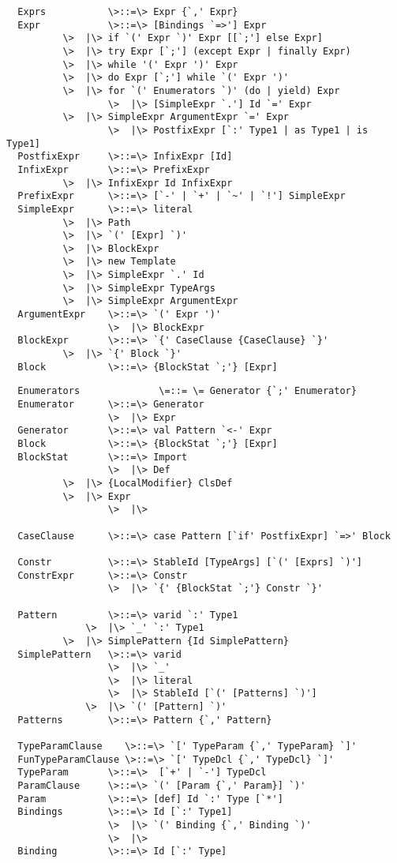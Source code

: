 \documentclass[11pt]{report}
\begin{document}
\begin{itemize}
\begin{verbatim}
  Exprs           \>::=\> Expr {`,' Expr}
  Expr            \>::=\> [Bindings `=>'] Expr
		  \>  |\> if `(' Expr `)' Expr [[`;'] else Expr]
		  \>  |\> try Expr [`;'] (except Expr | finally Expr)
		  \>  |\> while '(' Expr ')' Expr
		  \>  |\> do Expr [`;'] while `(' Expr ')'
		  \>  |\> for `(' Enumerators `)' (do | yield) Expr
                  \>  |\> [SimpleExpr `.'] Id `=' Expr
		  \>  |\> SimpleExpr ArgumentExpr `=' Expr
                  \>  |\> PostfixExpr [`:' Type1 | as Type1 | is Type1]
  PostfixExpr     \>::=\> InfixExpr [Id]
  InfixExpr       \>::=\> PrefixExpr
		  \>  |\> InfixExpr Id InfixExpr
  PrefixExpr      \>::=\> [`-' | `+' | `~' | `!'] SimpleExpr 
  SimpleExpr      \>::=\> literal
		  \>  |\> Path
		  \>  |\> `(' [Expr] `)'
		  \>  |\> BlockExpr
		  \>  |\> new Template 
		  \>  |\> SimpleExpr `.' Id 
		  \>  |\> SimpleExpr TypeArgs
		  \>  |\> SimpleExpr ArgumentExpr
  ArgumentExpr    \>::=\> `(' Expr ')'
                  \>  |\> BlockExpr
  BlockExpr       \>::=\> `{' CaseClause {CaseClause} `}'
		  \>  |\> `{' Block `}'
  Block           \>::=\> {BlockStat `;'} [Expr]
\end{verbatim}

\begin{verbatim}
  Enumerators              \=::= \= Generator {`;' Enumerator}
  Enumerator      \>::=\> Generator
                  \>  |\> Expr
  Generator       \>::=\> val Pattern `<-' Expr
  Block           \>::=\> {BlockStat `;'} [Expr]
  BlockStat       \>::=\> Import
                  \>  |\> Def
		  \>  |\> {LocalModifier} ClsDef
		  \>  |\> Expr
                  \>  |\>

  CaseClause      \>::=\> case Pattern [`if' PostfixExpr] `=>' Block 

  Constr          \>::=\> StableId [TypeArgs] [`(' [Exprs] `)']  
  ConstrExpr      \>::=\> Constr 
                  \>  |\> `{' {BlockStat `;'} Constr `}'

  Pattern         \>::=\> varid `:' Type1
	          \>  |\> `_' `:' Type1
		  \>  |\> SimplePattern {Id SimplePattern}
  SimplePattern   \>::=\> varid
                  \>  |\> `_'
                  \>  |\> literal
                  \>  |\> StableId [`(' [Patterns] `)']
	          \>  |\> `(' [Pattern] `)'
  Patterns        \>::=\> Pattern {`,' Pattern}

  TypeParamClause    \>::=\> `[' TypeParam {`,' TypeParam} `]'
  FunTypeParamClause \>::=\> `[' TypeDcl {`,' TypeDcl} `]'
  TypeParam       \>::=\>  [`+' | `-'] TypeDcl
  ParamClause     \>::=\> `(' [Param {`,' Param}] `)'
  Param           \>::=\> [def] Id `:' Type [`*']
  Bindings        \>::=\> Id [`:' Type1]
                  \>  |\> `(' Binding {`,' Binding `)'
                  \>  |\>
  Binding         \>::=\> Id [`:' Type]


\end{verbatim}
\end{itemize}
\end{document}
